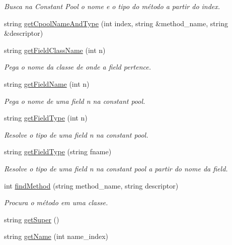 \begin{DoxyCompactItemize}
\begin{DoxyCompactList}\small\item\em Busca na Constant Pool o nome e o tipo do método a partir do index. \end{DoxyCompactList}\item 
string \hyperlink{classClassFile_a5d47b42f630f4e1710cdd1155168f598}{get\+Cpool\+Name\+And\+Type} (int index, string \&method\+\_\+name, string \&descriptor)
\item 
string \hyperlink{classClassFile_a6088b3d4e2980da3f62d36c647f5867a}{get\+Field\+Class\+Name} (int n)
\begin{DoxyCompactList}\small\item\em Pega o nome da classe de onde a field pertence. \end{DoxyCompactList}\item 
string \hyperlink{classClassFile_aa502c698d9ba9e511d59b7667c4c7f20}{get\+Field\+Name} (int n)
\begin{DoxyCompactList}\small\item\em Pega o nome de uma field n na constant pool. \end{DoxyCompactList}\item 
string \hyperlink{classClassFile_a6ad7cafd53e2847bd29893ef197f16f2}{get\+Field\+Type} (int n)
\begin{DoxyCompactList}\small\item\em Resolve o tipo de uma field n na constant pool. \end{DoxyCompactList}\item 
string \hyperlink{classClassFile_a87ec0023567d146ba4569016d1247e86}{get\+Field\+Type} (string fname)
\begin{DoxyCompactList}\small\item\em Resolve o tipo de uma field n na constant pool a partir do nome da field. \end{DoxyCompactList}\item 
int \hyperlink{classClassFile_a6287b244d8c558716150cb3bd799af6f}{find\+Method} (string method\+\_\+name, string descriptor)
\begin{DoxyCompactList}\small\item\em Procura o método em uma classe. \end{DoxyCompactList}\item 
string \hyperlink{classClassFile_a140efaffe0358589f5b40e13c5ef807c}{get\+Super} ()
\item 
string \hyperlink{classClassFile_a597f16f2884e82ac447d079c6ae3ce76}{get\+Name} (int name\+\_\+index)

\end{DoxyCompactItemize}
